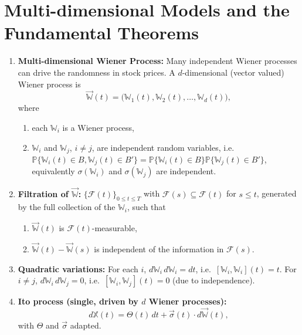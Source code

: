 
\section{Multi-dimensional Models and the Fundamental Theorems}

\begin{enumerate}
    \item \textbf{Multi-dimensional Wiener Process:} Many independent Wiener processes can drive the randomness in stock prices. A $d$-dimensional (vector valued) Wiener process is
    \[\vec{\mathbb{W}}(t) = \bigl(\mathbb{W}_1(t), \mathbb{W}_2(t), \dots, \mathbb{W}_d(t)\bigr),\]
    where
    \begin{enumerate}
        \item each $\mathbb{W}_i$ is a Wiener process,
        \item $\mathbb{W}_i$ and $\mathbb{W}_j$, $i \neq j$, are independent random variables, i.e.\ $\mathbb{P}\{\mathbb{W}_i(t) \in B, \mathbb{W}_j(t) \in B'\} = \mathbb{P}\{\mathbb{W}_i(t) \in B\}\mathbb{P}\{\mathbb{W}_j(t) \in B'\}$, equivalently $\sigma(\mathbb{W}_i)$ and $\sigma(\mathbb{W}_j)$ are independent.
    \end{enumerate}

    \item \textbf{Filtration of $\vec{\mathbb{W}}$:} $\{\mathcal{F}(t)\}_{0 \leq t \leq T}$ with $\mathcal{F}(s) \subseteq \mathcal{F}(t)$ for $s \leq t$, generated by the full collection of the $\mathbb{W}_i$, such that
    \begin{enumerate}
        \item $\vec{\mathbb{W}}(t)$ is $\mathcal{F}(t)$-measurable,
        \item $\vec{\mathbb{W}}(t) - \vec{\mathbb{W}}(s)$ is independent of the information in $\mathcal{F}(s)$.
    \end{enumerate}

    \item \textbf{Quadratic variations:} For each $i$, $d\mathbb{W}_i\, d\mathbb{W}_i = dt$, i.e.\ $[\mathbb{W}_i, \mathbb{W}_i](t) = t$. For $i \neq j$, $d\mathbb{W}_i\, d\mathbb{W}_j = 0$, i.e.\ $[\mathbb{W}_i, \mathbb{W}_j](t) = 0$ (due to independence).

    \item \textbf{Ito process (single, driven by $d$ Wiener processes):}
    \[d\mathbb{X}(t) = \Theta(t)\, dt + \vec{\sigma}(t)\cdot d\vec{\mathbb{W}}(t),\]
    with $\Theta$ and $\vec{\sigma}$ adapted.


\end{enumerate}
